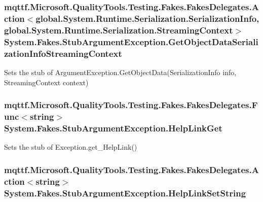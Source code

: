 \hypertarget{class_system_1_1_fakes_1_1_stub_argument_exception_a4ba652c2f2d8293230bd4e13bce2cd6c}{
\subsubsection[{Get\-Object\-Data\-Serialization\-Info\-Streaming\-Context}]{\setlength{\rightskip}{0pt plus 5cm}mqttf.\-Microsoft.\-Quality\-Tools.\-Testing.\-Fakes.\-Fakes\-Delegates.\-Action$<$global.\-System.\-Runtime.\-Serialization.\-Serialization\-Info, global.\-System.\-Runtime.\-Serialization.\-Streaming\-Context$>$ System.\-Fakes.\-Stub\-Argument\-Exception.\-Get\-Object\-Data\-Serialization\-Info\-Streaming\-Context}}\label{class_system_1_1_fakes_1_1_stub_argument_exception_a4ba652c2f2d8293230bd4e13bce2cd6c}


Sets the stub of Argument\-Exception.\-Get\-Object\-Data(\-Serialization\-Info info, Streaming\-Context context)

\hypertarget{class_system_1_1_fakes_1_1_stub_argument_exception_a81e6b00f75d059e2737280a3cf1f562b}{
\subsubsection[{Help\-Link\-Get}]{\setlength{\rightskip}{0pt plus 5cm}mqttf.\-Microsoft.\-Quality\-Tools.\-Testing.\-Fakes.\-Fakes\-Delegates.\-Func$<$string$>$ System.\-Fakes.\-Stub\-Argument\-Exception.\-Help\-Link\-Get}}\label{class_system_1_1_fakes_1_1_stub_argument_exception_a81e6b00f75d059e2737280a3cf1f562b}


Sets the stub of Exception.\-get\-\_\-\-Help\-Link()

\hypertarget{class_system_1_1_fakes_1_1_stub_argument_exception_a1c4fd9af838e439ceaaea416b90667c7}{
\subsubsection[{Help\-Link\-Set\-String}]{\setlength{\rightskip}{0pt plus 5cm}mqttf.\-Microsoft.\-Quality\-Tools.\-Testing.\-Fakes.\-Fakes\-Delegates.\-Action$<$string$>$ System.\-Fakes.\-Stub\-Argument\-Exception.\-Help\-Link\-Set\-String}}\label{class_system_1_1_fakes_1_1_stub_argument_exception_a1c4fd9af838e439ceaaea416b90667c7}


